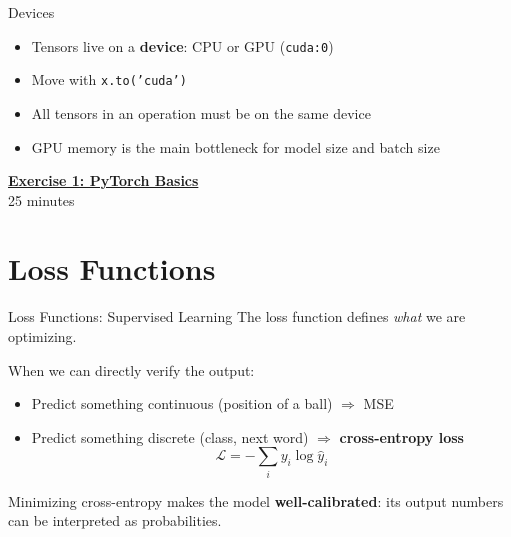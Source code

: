\documentclass[aspectratio=169]{beamer}
\begin{document}
\begin{frame}[fragile]{Devices}
\begin{itemize}
\item Tensors live on a \textbf{device}: CPU or GPU (\texttt{cuda:0})
\item Move with \texttt{x.to('cuda')}
\item All tensors in an operation must be on the same device
\item GPU memory is the main bottleneck for model size and batch size
\end{itemize}
\end{frame}

\begin{frame}{}
\centering
\Large \href{https://colab.research.google.com/github/iliad-team/iliad-intensive-C.1.1/blob/main/lectures/01_a_ml_foundations/exercises/01_pytorch_basics/notebook.ipynb}{\textbf{Exercise 1: PyTorch Basics}} \\[1em]
\normalsize 25 minutes \\[1em]
\end{frame}

\section{Loss Functions}

\begin{frame}{Loss Functions: Supervised Learning}
The loss function defines \emph{what} we are optimizing.
\vspace{0.5em}

When we can directly verify the output:
\begin{itemize}
\item Predict something continuous (position of a ball) $\Rightarrow$ MSE
\item Predict something discrete (class, next word) $\Rightarrow$ \textbf{cross-entropy loss}
$$\mathcal{L} = -\sum_i y_i \log \hat{y}_i$$
\end{itemize}
\vspace{0.5em}
Minimizing cross-entropy makes the model \textbf{well-calibrated}: its output numbers can be interpreted as probabilities.
\end{frame}
\end{document}
